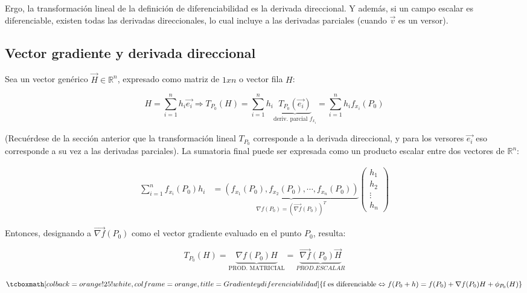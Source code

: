 \documentclass{article}
\renewcommand{\Bbb}{\mathbb}
\begin{document}
Ergo, la transformación lineal de la definición de diferenciabilidad es la derivada direccional. Y además, si un campo escalar es diferenciable, existen todas las derivadas direccionales, lo cual incluye a las derivadas parciales (cuando $\overrightarrow{v}$ es un versor).

\subsection{Vector gradiente y derivada direccional}

Sea un vector genérico $\overrightarrow{H} \in \Bbb R^n$, expresado como matriz de $1xn$ o vector fila $H$:

\begin{equation}
H = \sum_{i=1}^{n} {h_i \overrightarrow{e_i}} \Rightarrow T_{P_0}(H) = \sum_{i=1}^{n}{ h_i \underbrace{T_{P_0}(\overrightarrow{e_i})}_{\text{deriv. parcial } f_{x_i}} } = \sum_{i=1}^{n}{ h_i f_{x_i}(P_0) }
\end{equation}

(Recuérdese de la sección anterior que la transformación lineal $T_{P_0}$ corresponde a la derivada direccional, y para los versores $\overrightarrow{e_i}$ eso corresponde a su vez a las derivadas parciales). La sumatoria final puede ser expresada como un producto escalar entre dos vectores de $\Bbb R^n$:

\begin{align}
    \sum_{i=1}^{n}{ f_{x_i}(P_0) h_i } &= \underbrace{ (f_{x_1}(P_0), f_{x_2}(P_0), \cdots, f_{x_n}(P_0)) }_{ \nabla{f(P_0)} = (\overrightarrow{\nabla{f}}(P_0))^T }
    \begin{pmatrix}
           h_1 \\
           h_2 \\
           \vdots \\
           h_n
    \end{pmatrix}
\end{align}

Entonces, designando a $\overrightarrow{\nabla{f}}(P_0)$ como el vector gradiente evaluado en el punto $P_0$, resulta:

\begin{equation}
T_{P_0}(H) = \underbrace{ \nabla{f}(P_0) H }_{\text{PROD. MATRICIAL}} = \underbrace{ \overrightarrow{\nabla{f}}(P_0) \overrightarrow{H} }_{PROD. ESCALAR}
\end{equation}

\begin{equation}
\tcboxmath[colback=orange!25!white,colframe=orange, title=Gradiente y diferenciabilidad]
{ \text{f es diferenciable} \Leftrightarrow f(P_0 + h) = f(P_0) + \nabla{f}(P_0) H + \phi_{P_0}(H) }
\end{equation}
\end{document}
